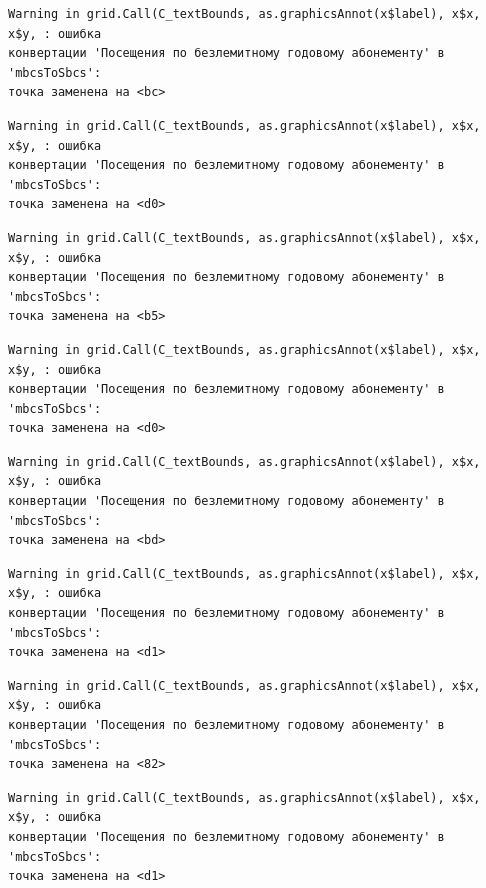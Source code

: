 \documentclass[
  letterpaper,
  DIV=11,
  numbers=noendperiod]{scrreprt}
\begin{document}
\begin{verbatim}
Warning in grid.Call(C_textBounds, as.graphicsAnnot(x$label), x$x, x$y, : ошибка
конвертации 'Посещения по безлемитному годовому абонементу' в 'mbcsToSbcs':
точка заменена на <bc>
\end{verbatim}

\begin{verbatim}
Warning in grid.Call(C_textBounds, as.graphicsAnnot(x$label), x$x, x$y, : ошибка
конвертации 'Посещения по безлемитному годовому абонементу' в 'mbcsToSbcs':
точка заменена на <d0>
\end{verbatim}

\begin{verbatim}
Warning in grid.Call(C_textBounds, as.graphicsAnnot(x$label), x$x, x$y, : ошибка
конвертации 'Посещения по безлемитному годовому абонементу' в 'mbcsToSbcs':
точка заменена на <b5>
\end{verbatim}

\begin{verbatim}
Warning in grid.Call(C_textBounds, as.graphicsAnnot(x$label), x$x, x$y, : ошибка
конвертации 'Посещения по безлемитному годовому абонементу' в 'mbcsToSbcs':
точка заменена на <d0>
\end{verbatim}

\begin{verbatim}
Warning in grid.Call(C_textBounds, as.graphicsAnnot(x$label), x$x, x$y, : ошибка
конвертации 'Посещения по безлемитному годовому абонементу' в 'mbcsToSbcs':
точка заменена на <bd>
\end{verbatim}

\begin{verbatim}
Warning in grid.Call(C_textBounds, as.graphicsAnnot(x$label), x$x, x$y, : ошибка
конвертации 'Посещения по безлемитному годовому абонементу' в 'mbcsToSbcs':
точка заменена на <d1>
\end{verbatim}

\begin{verbatim}
Warning in grid.Call(C_textBounds, as.graphicsAnnot(x$label), x$x, x$y, : ошибка
конвертации 'Посещения по безлемитному годовому абонементу' в 'mbcsToSbcs':
точка заменена на <82>
\end{verbatim}

\begin{verbatim}
Warning in grid.Call(C_textBounds, as.graphicsAnnot(x$label), x$x, x$y, : ошибка
конвертации 'Посещения по безлемитному годовому абонементу' в 'mbcsToSbcs':
точка заменена на <d1>
\end{verbatim}
\end{document}
